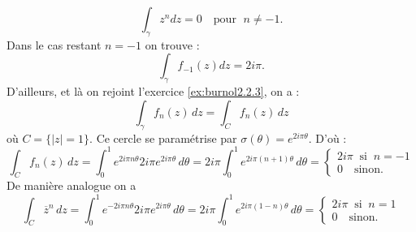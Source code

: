 {\begin{enumerate}
{$$\int_\gamma z^n dz =0 \quad \text{pour } \; n\neq -1.$$
Dans le cas restant $n=-1$ on trouve :
$$\int_\gamma f_{-1}(z)dz =2i\pi.$$
D'ailleurs, et l\`a on rejoint l'exercice \ref{ex:burnol2.2.3}, on a :
$$\int_\gamma f_n(z)\, dz = \int_C f_n(z)\, dz $$
o\`u $C=\{ |z|=1\}$. Ce cercle se param\'etrise par $\sigma (\theta ) =e^{2i\pi \theta}$. D'o\`u :
$$\int_C f_n(z)\, dz=\int_0^1 e^{2i\pi n\theta} 2i\pi e^{2i\pi \theta} \, d\theta
=2i\pi \int_0^1 e^{2i\pi (n+1) \theta}\, d\theta =\left\{ \begin{array}{c}
                                                            2i\pi \;\; \text{si} \;\; n=-1 \\
                                                            0 \quad \text{sinon}.
                                                          \end{array}
\right.$$
De mani\`ere analogue on a
$$\int_C \overline{z}^n\, dz=\int_0^1 e^{-2i\pi n\theta} 2i\pi e^{2i\pi \theta} \, d\theta
=2i\pi \int_0^1 e^{2i\pi (1-n) \theta}\, d\theta =\left\{ \begin{array}{c}
                                                            2i\pi \;\; \text{si} \;\; n=1 \\
                                                            0 \quad \text{sinon.}
                                                          \end{array}
\right.$$
}
\end{enumerate}
}
